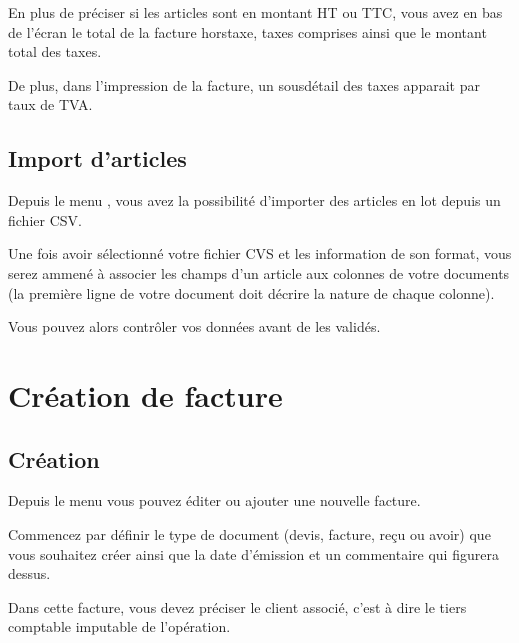 \documentclass[a4paper,10pt,oneside,french]{sphinxmanual}
\begin{document}
\sphinxAtStartPar
En plus de préciser si les articles sont en montant HT ou TTC, vous avez en bas de l’écran le total de la facture hors\sphinxhyphen{}taxe, taxes comprises ainsi que le montant total des taxes.

\sphinxAtStartPar
De plus, dans l’impression de la facture, un sous\sphinxhyphen{}détail des taxes apparait par taux de TVA.


\subsection{Import d’articles}
\label{\detokenize{invoice/articles:import-d-articles}}
\sphinxAtStartPar
Depuis le menu , vous avez la possibilité d’importer des articles en lot depuis un fichier CSV.

\sphinxAtStartPar
Une fois avoir sélectionné votre fichier CVS et les information de son format,
vous serez ammené à associer les champs d’un article aux colonnes de votre documents (la première ligne de votre document doit décrire la nature de chaque colonne).

\sphinxAtStartPar
Vous pouvez alors contrôler vos données avant de les validés.


\section{Création de facture}
\label{\detokenize{invoice/create_bill:creation-de-facture}}\label{\detokenize{invoice/create_bill::doc}}

\subsection{Création}
\label{\detokenize{invoice/create_bill:creation}}
\sphinxAtStartPar
Depuis le menu  vous pouvez éditer ou ajouter une nouvelle facture.

\sphinxAtStartPar
Commencez par définir le type de document (devis, facture, reçu ou avoir) que vous souhaitez créer ainsi que la date d’émission et un commentaire qui figurera dessus.

\sphinxAtStartPar
Dans cette facture, vous devez préciser le client associé, c’est à dire le tiers comptable imputable de l’opération.
\begin{quote}

\noindent{}
\end{quote}
\end{document}
